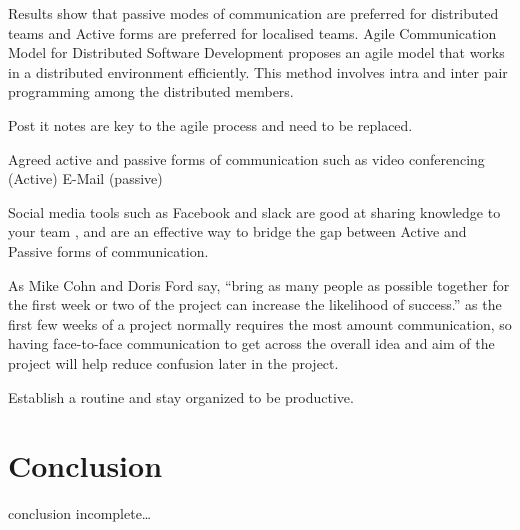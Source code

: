 \documentclass{scrartcl}
\begin{document}
Results show that passive modes of communication are preferred for distributed teams and Active forms are preferred for localised teams. \cite{joshi2013}
Agile Communication Model for Distributed Software Development \cite{bhalerao2010} proposes an agile model that works in a distributed environment efficiently. This method involves intra and inter pair programming among the distributed members.

Post it notes are key to the agile process and need to be replaced.

Agreed active and passive forms of communication such as video conferencing (Active) E-Mail (passive) \cite{joshi2013}

Social media tools such as Facebook and slack are good at sharing knowledge to your team \cite{Agile-on-the-beach-cite}, and are an effective way to bridge the gap between Active and Passive forms of communication.

As Mike Cohn and Doris Ford say, ``bring as many people as possible together for the first week or two of the project can increase the likelihood of success.'' \cite{cohn2003} as the first few weeks of a project normally requires the most amount communication, so having face-to-face communication to get across the overall idea and aim of the project will help reduce confusion later in the project.

Establish a routine and stay organized to be productive. \cite{Agile-on-the-beach-cite}

\section{Conclusion}

conclusion incomplete\ldots




\end{document}
